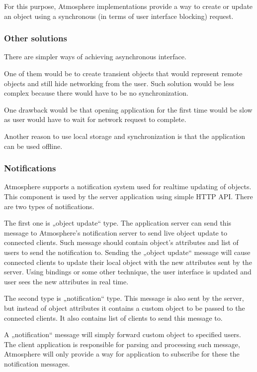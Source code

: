 For this purpose, Atmosphere implementations provide a way to create or update an object using a synchronous (in terms of user interface blocking) request. 

\subsubsection{Other solutions}

There are simpler ways of achieving asynchronous interface.

One of them would be to create transient objects that would represent remote objects and still hide networking from the user. Such solution would be less complex because there would have to be no synchronization.

 One drawback would be that opening application for the first time would be slow as user would have to wait for network request to complete. 

Another reason to use local storage and synchronization is that the application can be used offline.

\subsubsection{Notifications}

Atmosphere supports a notification system used for realtime updating of objects. This component is used by the server application using simple HTTP API. There are two types of notifications.

The first one is „object update“ type. The application server can send this  message to Atmosphere’s notification server to send live object update to connected clients. Such message should contain object’s attributes and list of users to send the notification to. Sending the „object update“ message will cause connected clients to update their local object with the new attributes sent by the server. Using bindings or some other technique, the user interface is updated and user sees the new attributes in real time.

The second type is „notification“ type. This message is also sent by the server, but instead of object attributes it contains a custom object to be passed to the connected clients. It also contains list of clients to send this message to. 

A „notification“ message will simply forward custom object to specified users. The client application is responsible for parsing and processing such message, Atmosphere will only provide a way for application to subscribe for these the notification messages. 

